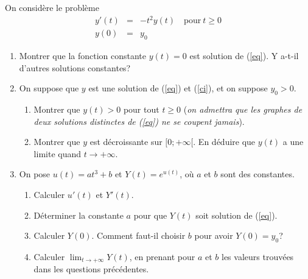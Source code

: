 \begin{exo}
    \noindent On considère le problème
    \begin{eqnarray}
        y'(t)&=&-t^2y(t)\quad\mathrm{pour}\ t\ge 0 \label{eq}\\
        y(0)&=&y_0\label{ci}
    \end{eqnarray}
    \begin{enumerate}
        \item Montrer que la fonction constante $y(t)=0$ est solution de (\ref{eq}). Y a-t-il d'autres solutions constantes?
        \item On suppose que $y$ est une solution de (\ref{eq}) et (\ref{ci}), et on
        suppose $y_0>0$.
        \begin{enumerate}
            \item  Montrer que $y(t)>0$ pour tout $t\ge 0$ ({\it on admettra que les graphes
            de deux solutions distinctes de (\ref{eq}) ne se coupent jamais}).
            \item Montrer que $y$ est décroissante sur $[0;+\infty[$. En déduire que $y(t)$ a une limite quand $t\to +\infty$.
        \end{enumerate}
        \item On pose $u(t)=at^3+b$ et $Y(t)=e^{u(t)}$, où $a$ et $b$ sont des constantes.
        \begin{enumerate}
            \item Calculer $u'(t)$ et $Y'(t)$.
            \item Déterminer la constante $a$ pour que $Y(t)$ soit solution de (\ref{eq}).
            \item Calculer $Y(0)$. Comment faut-il choisir $b$ pour avoir $Y(0)=y_0$?
            \item Calculer $\lim_{t\to +\infty}Y(t)$, en prenant pour $a$ et $b$ les valeurs trouvées dans les questions précédentes.
        \end{enumerate}
    \end{enumerate}
\end{exo}

